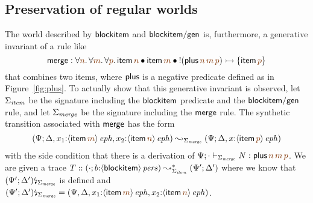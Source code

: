 \subsection{Preservation of regular worlds}

The world described by ${\sf blockitem}$ and ${\sf blockitem/gen}$ is,
furthermore, a generative invariant of a rule like 
\[
  {\sf merge} : 
  \forall \lf{n}.\,\forall\lf{m}.\,\forall\lf{p}.\,
   {\sf item}\,\lf{n} \fuse
   {\sf item}\,\lf{m} \fuse
   {!}({\sf plus}\,\lf{n}\,\lf{m}\,\lf{p}) 
    \lefti \{ {\sf item}\,\lf{p} \}
\]
that combines two items, 
where ${\sf plus}$ is a negative predicate defined as in 
Figure~\ref{fig:plus}.  
To actually show that this generative invariant is observed, let
$\Sigma_{\it item}$ be the signature including the ${\sf blockitem}$
predicate and the ${\sf blockitem/gen}$ rule, and let $\Sigma_{\it
  merge}$ be the signature including the ${\sf merge}$ rule. 
The synthetic transition associated with ${\sf merge}$ 
has the form 
\[
(\Psi; \Delta, x_1{:}\iseph{\susp{{\sf item}\,\lf{m}}},
          x_2{:}\iseph{\susp{{\sf item}\,\lf{n}}}) 
\leadsto_{\Sigma_{\it merge}} 
 (\Psi; \Delta, x{:}\iseph{\susp{{\sf item}\,\lf{p}}})\]
with the side condition that there is a derivation
of $\Psi; \cdot \vdash_{\Sigma_{\it merge}} N : 
    {\sf plus}\,\lf{n}\,\lf{m}\,\lf{p}$. 
We are given a trace
$T :: (\cdot; b{:}{\langle {{\sf blockitem}} \rangle}\,{{\it pers}}) \leadsto^*_{\Sigma_{\it item}}
     (\Psi'; \Delta')$ where we know that
${(\Psi'; \Delta')}{\mbox{\lightning}}_{\Sigma_{\it merge}}$ is defined and
$\restrictsig{(\Psi'; \Delta')}{\Sigma_{\it merge}} = 
 (\Psi, \Delta, x_1{:}\iseph{\susp{{\sf item}\,\lf{m}}},
          x_2{:}\iseph{\susp{{\sf item}\,\lf{n}}})$. 





